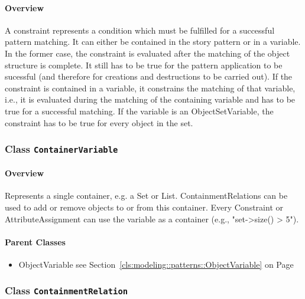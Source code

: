 \paragraph{Overview}

	
			
A constraint represents a condition which must be fulfilled for a successful pattern matching. It can either be contained in the story pattern or in a variable. In the former case, the constraint is evaluated after the matching of the object structure is complete. It still has to be true for the pattern application to be sucessful (and therefore for creations and destructions to be carried out). If the constraint is contained in a variable, it constrains the matching of that variable, i.e., it is evaluated during the matching of the containing variable and has to be true for a successful matching. If the variable is an ObjectSetVariable, the constraint has to be true for every object in the set.	
		
	



\subsubsection{\Large{Class \bfseries \texttt{ContainerVariable}\normalfont}}
\label{cls:modeling::patterns::ContainerVariable} 
\paragraph{Overview}

	
			
Represents a single container, e.g. a Set or List. ContainmentRelations can be used to add or remove objects to or from this container.
Every Constraint or AttributeAssignment can use the variable as a container (e.g., "set->size() > 5").	
		
	



\paragraph{Parent Classes}
\begin{itemize}
\item ObjectVariable see Section~\ref{cls:modeling::patterns::ObjectVariable} on Page~\pageref{cls:modeling::patterns::ObjectVariable}\end{itemize}
\subsubsection{\Large{Class \bfseries \texttt{ContainmentRelation}\normalfont}}
\label{cls:modeling::patterns::ContainmentRelation} 

